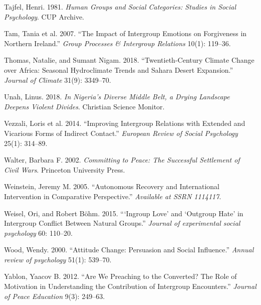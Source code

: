 \documentclass[11pt]{article}
\begin{document}
\hypertarget{ref-tajfel1981groups}{}
Tajfel, Henri. 1981. \emph{Human Groups and Social Categories: Studies
in Social Psychology}. CUP Archive.

\hypertarget{ref-tam2007impact}{}
Tam, Tania et al. 2007. ``The Impact of Intergroup Emotions on
Forgiveness in Northern Ireland.'' \emph{Group Processes \& Intergroup
Relations} 10(1): 119--36.

\hypertarget{ref-thomas2018sahara}{}
Thomas, Natalie, and Sumant Nigam. 2018. ``Twentieth-Century Climate
Change over Africa: Seasonal Hydroclimate Trends and Sahara Desert
Expansion.'' \emph{Journal of Climate} 31(9): 3349--70.

\hypertarget{ref-unah2018nigeria}{}
Unah, Linus. 2018. \emph{In Nigeria's Diverse Middle Belt, a Drying
Landscape Deepens Violent Divides}. Christian Science Monitor.

\hypertarget{ref-vezzali2014indirect}{}
Vezzali, Loris et al. 2014. ``Improving Intergroup Relations with
Extended and Vicarious Forms of Indirect Contact.'' \emph{European
Review of Social Psychology} 25(1): 314--89.

\hypertarget{ref-walter2002committing}{}
Walter, Barbara F. 2002. \emph{Committing to Peace: The Successful
Settlement of Civil Wars}. Princeton University Press.

\hypertarget{ref-weinstein2005autonomous}{}
Weinstein, Jeremy M. 2005. ``Autonomous Recovery and International
Intervention in Comparative Perspective.'' \emph{Available at SSRN
1114117}.

\hypertarget{ref-weisel2015ingroup}{}
Weisel, Ori, and Robert Böhm. 2015. ```Ingroup Love' and `Outgroup Hate'
in Intergroup Conflict Between Natural Groups.'' \emph{Journal of
experimental social psychology} 60: 110--20.

\hypertarget{ref-wood2000attitude}{}
Wood, Wendy. 2000. ``Attitude Change: Persuasion and Social Influence.''
\emph{Annual review of psychology} 51(1): 539--70.

\hypertarget{ref-yablon2012we}{}
Yablon, Yaacov B. 2012. ``Are We Preaching to the Converted? The Role of
Motivation in Understanding the Contribution of Intergroup Encounters.''
\emph{Journal of Peace Education} 9(3): 249--63.
\end{document}
